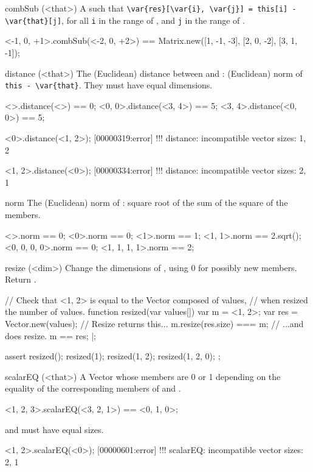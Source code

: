 \begin{urbiscriptapi}
\item[combSub](<that>)%
  A   such that
  \lstinline|\var{res}[\var{i}, \var{j}] = this[i] - \var{that}[j]|, for all
  \lstinline|i| in the range of \this, and \lstinline|j| in the range of
  \that.
\begin{urbiassert}
<-1, 0, +1>.combSub(<-2, 0, +2>)
  == Matrix.new([1, -1, -3],
                [2,  0, -2],
                [3,  1, -1]);
\end{urbiassert}


\item[distance](<that>)%
  The (Euclidean) distance between \this and \that: (Euclidean) norm of
  \lstinline|this - \var{that}|.  They must have equal dimensions.
\begin{urbiassert}
  <>.distance(<>) == 0;
  <0, 0>.distance(<3, 4>) == 5;
  <3, 4>.distance(<0, 0>) == 5;
\end{urbiassert}

\begin{urbiscript}
<0>.distance(<1, 2>);
[00000319:error] !!! distance: incompatible vector sizes: 1, 2

<1, 2>.distance(<0>);
[00000334:error] !!! distance: incompatible vector sizes: 2, 1
\end{urbiscript}


\item[norm]%
  The (Euclidean) norm of \this: square root of the sum of the square of the
  members.
\begin{urbiassert}
 <>.norm == 0;
 <0>.norm == 0;
 <1>.norm == 1;
 <1, 1>.norm == 2.sqrt();
 <0, 0, 0, 0>.norm == 0;
 <1, 1, 1, 1>.norm == 2;
\end{urbiassert}

\item[resize](<dim>)%
  Change the dimensions of \this, using 0 for possibly new members.  Return
  \this.
\begin{urbiscript}
// Check that <1, 2> is equal to the Vector composed of values,
// when resized the number of values.
function resized(var values[])
{
  var m = <1, 2>;
  var res = Vector.new(values);
  // Resize returns this...
  m.resize(res.size) === m;
  // ...and does resize.
  m == res;
}|;

assert
{
  resized();
  resized(1);
  resized(1, 2);
  resized(1, 2, 0);
};
\end{urbiscript}


\item[scalarEQ](<that>)%
  A Vector whose members are 0 or 1 depending on the equality of the
  corresponding members of \this and \that.
\begin{urbiassert}
  <1, 2, 3>.scalarEQ(<3, 2, 1>) == <0, 1, 0>;
\end{urbiassert}
  \this and \that must have equal sizes.
\begin{urbiscript}
<1, 2>.scalarEQ(<0>);
[00000601:error] !!! scalarEQ: incompatible vector sizes: 2, 1
\end{urbiscript}



\end{urbiscriptapi}
